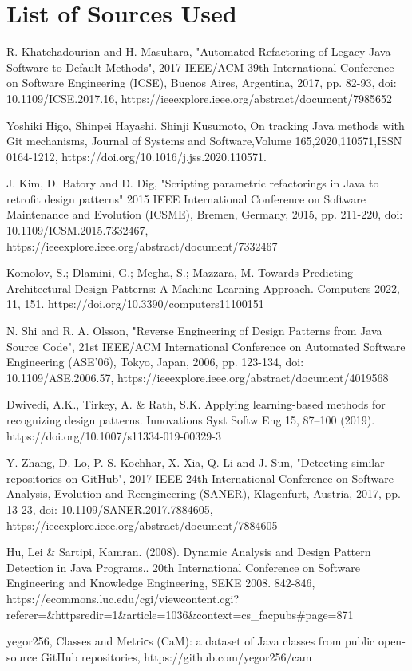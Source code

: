 \documentclass[draft]{article}
\begin{document}
\newpage
\section*{List of Sources Used}
\begin{thebibliography}{9}
  R. Khatchadourian and H. Masuhara, "{}Automated Refactoring of Legacy Java Software to Default Methods"{}, 2017 IEEE/ACM 39th International Conference on Software Engineering (ICSE), Buenos Aires, Argentina, 2017, pp. 82-93, doi: 10.1109/ICSE.2017.16, https://ieeexplore.ieee.org/abstract/document/7985652

  Yoshiki Higo, Shinpei Hayashi, Shinji Kusumoto, On tracking Java methods with Git mechanisms, Journal of Systems and Software,Volume 165,2020,110571,ISSN 0164-1212, https://doi.org/10.1016/j.jss.2020.110571.

  J. Kim, D. Batory and D. Dig, "{}Scripting parametric refactorings in Java to retrofit design patterns"{} 2015 IEEE International Conference on Software Maintenance and Evolution (ICSME), Bremen, Germany, 2015, pp. 211-220, doi: 10.1109/ICSM.2015.7332467, https://ieeexplore.ieee.org/abstract/document/7332467

  Komolov, S.; Dlamini, G.; Megha, S.; Mazzara, M. Towards Predicting Architectural Design Patterns: A Machine Learning Approach. Computers 2022, 11, 151. https://doi.org/10.3390/computers11100151

  N. Shi and R. A. Olsson, "{}Reverse Engineering of Design Patterns from Java Source Code"{}, 21st IEEE/ACM International Conference on Automated Software Engineering (ASE'06), Tokyo, Japan, 2006, pp. 123-134, doi: 10.1109/ASE.2006.57, https://ieeexplore.ieee.org/abstract/document/4019568

  Dwivedi, A.K., Tirkey, A. \& Rath, S.K. Applying learning-based methods for recognizing design patterns. Innovations Syst Softw Eng 15, 87–100 (2019). https://doi.org/10.1007/s11334-019-00329-3

  Y. Zhang, D. Lo, P. S. Kochhar, X. Xia, Q. Li and J. Sun, "{}Detecting similar repositories on GitHub"{}, 2017 IEEE 24th International Conference on Software Analysis, Evolution and Reengineering (SANER), Klagenfurt, Austria, 2017, pp. 13-23, doi: 10.1109/SANER.2017.7884605, https://ieeexplore.ieee.org/abstract/document/7884605

  Hu, Lei \& Sartipi, Kamran. (2008). Dynamic Analysis and Design Pattern Detection in Java Programs.. 20th International Conference on Software Engineering and Knowledge Engineering, SEKE 2008. 842-846, https://ecommons.luc.edu/cgi/viewcontent.cgi?referer=\&httpsredir=1\&article=1036\&context=cs\_facpubs\#page=871

  yegor256, Classes and Metriсs (CaM): a dataset of Java classes from public open-source GitHub repositories, https://github.com/yegor256/cam
\end{thebibliography}
\end{document}
